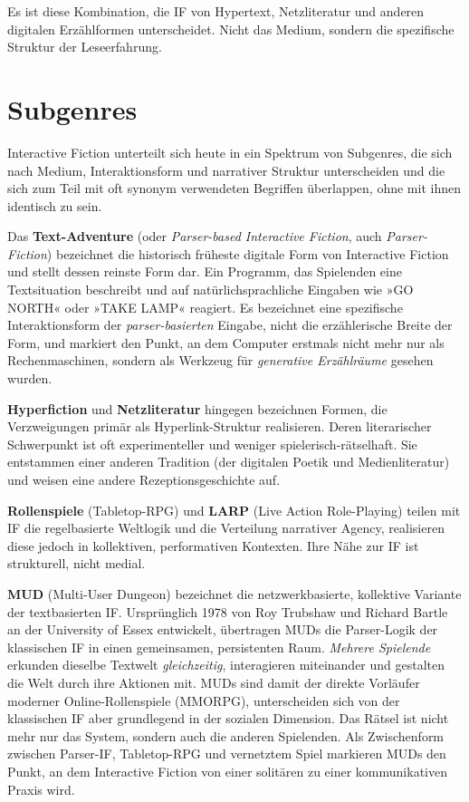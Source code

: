 \documentclass[parskip=half,a4paper,11pt]{scrreprt}
\begin{document}
Es ist diese Kombination, die IF von Hypertext, Netzliteratur und anderen digitalen Erzählformen unterscheidet. Nicht das Medium, sondern die spezifische Struktur der Leseerfahrung.

\section{Subgenres}
Interactive Fiction unterteilt sich heute in ein Spektrum von Subgenres, die sich nach Medium, Interaktionsform und narrativer Struktur unterscheiden und die sich zum Teil mit oft synonym verwendeten Begriffen überlappen, ohne mit ihnen identisch zu sein.

Das \textbf{Text-Adventure} (oder \textit{Parser-based Interactive Fiction}, auch \textit{Parser-Fiction}) bezeichnet die historisch früheste digitale Form von Interactive Fiction und stellt dessen reinste Form dar. Ein Programm, das Spielenden eine Textsituation beschreibt und auf natürlichsprachliche Eingaben wie »GO NORTH« oder »TAKE LAMP« reagiert. Es bezeichnet eine spezifische Interaktionsform der \textit{parser-basierten} Eingabe, nicht die erzählerische Breite der Form, und markiert den Punkt, an dem Computer erstmals nicht mehr nur als Rechenmaschinen, sondern als Werkzeug für \textit{generative Erzählräume} gesehen wurden.

\textbf{Hyperfiction} und \textbf{Netzliteratur} hingegen bezeichnen Formen, die Verzweigungen primär als Hyperlink-Struktur realisieren. Deren literarischer Schwerpunkt ist oft experimenteller und weniger spielerisch-rätselhaft. Sie entstammen einer anderen Tradition (der digitalen Poetik und Medienliteratur) und weisen eine andere Rezeptionsgeschichte auf.

\textbf{Rollenspiele} (Tabletop-RPG) und \textbf{LARP} (Live Action Role-Playing) teilen mit IF die regelbasierte Weltlogik und die Verteilung narrativer Agency, realisieren diese jedoch in kollektiven, performativen Kontexten. Ihre Nähe zur IF ist strukturell, nicht medial.

\textbf{MUD} (Multi-User Dungeon) bezeichnet die netzwerkbasierte, kollektive Variante der textbasierten IF. Ursprünglich 1978 von Roy Trubshaw und Richard Bartle an der University of Essex entwickelt, übertragen MUDs die Parser-Logik der klassischen IF in einen gemeinsamen, persistenten Raum. \textit{Mehrere Spielende} erkunden dieselbe Textwelt \textit{gleichzeitig}, interagieren miteinander und gestalten die Welt durch ihre Aktionen mit. MUDs sind damit der direkte Vorläufer moderner Online-Rollenspiele (MMORPG), unterscheiden sich von der klassischen IF aber grundlegend in der sozialen Dimension. Das Rätsel ist nicht mehr nur das System, sondern auch die anderen Spielenden. Als Zwischenform zwischen Parser-IF, Tabletop-RPG und vernetztem Spiel markieren MUDs den Punkt, an dem Interactive Fiction von einer solitären zu einer kommunikativen Praxis wird.
\end{document}
